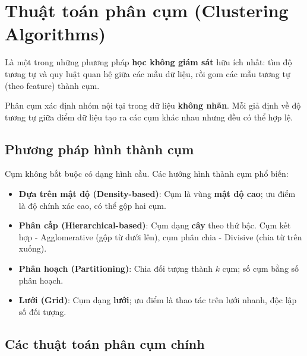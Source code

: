 \section{Thuật toán phân cụm (Clustering Algorithms)}
\label{sec:clustering-algorithms}

\begin{dinhnghia}[title={Thuật toán phân cụm}]
Là một trong những phương pháp \textbf{học không giám sát} hữu ích nhất: tìm độ tương tự và quy luật quan hệ giữa các mẫu dữ liệu, rồi gom các mẫu tương tự (theo feature) thành cụm.
\end{dinhnghia}

\begin{ynghia}[title={Tầm quan trọng}]
Phân cụm xác định nhóm nội tại trong dữ liệu \textbf{không nhãn}.
Mỗi giả định về độ tương tự giữa điểm dữ liệu tạo ra các cụm khác nhau nhưng đều có thể hợp lệ.
\end{ynghia}


\subsection{Phương pháp hình thành cụm}

\begin{phuongphap}[title={Không nhất thiết hình cầu}]
Cụm không bắt buộc có dạng hình cầu. Các hướng hình thành cụm phổ biến:
\begin{itemize}
  \item \textbf{Dựa trên mật độ (Density-based)}: Cụm là vùng \textbf{mật độ cao}; ưu điểm là độ chính xác cao, có thể gộp hai cụm.
  \item \textbf{Phân cấp (Hierarchical-based)}: Cụm dạng \textbf{cây} theo thứ bậc. Cụm kết hợp - Agglomerative (gộp từ dưới lên), cụm phân chia - Divisive (chia từ trên xuống).
  \item \textbf{Phân hoạch (Partitioning)}: Chia đối tượng thành $k$ cụm; số cụm bằng số phân hoạch.
  \item \textbf{Lưới (Grid)}: Cụm dạng \textbf{lưới}; ưu điểm là thao tác trên lưới nhanh, độc lập số đối tượng.
\end{itemize}
\end{phuongphap}

\subsection{Các thuật toán phân cụm chính}

